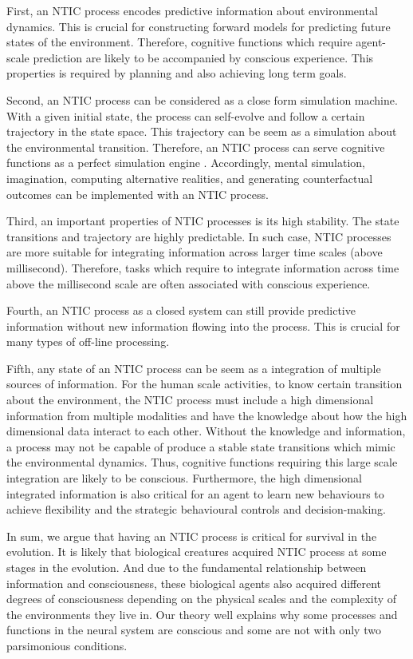 \documentclass[utf8]{article}
\begin{document}
		First, an NTIC process encodes predictive information about environmental dynamics. This is crucial for constructing forward models for predicting future states of the environment. Therefore, cognitive functions which require agent-scale prediction are likely to be accompanied by conscious experience. This properties is required by planning and also achieving long term goals.\needref{}
		
		Second, an NTIC process can be considered as a close form simulation machine. With a given initial state, the process can self-evolve and follow a certain trajectory in the state space. This trajectory can be seem as a simulation about the environmental transition. Therefore, an NTIC process can serve cognitive functions as a perfect simulation engine \citep{BERTSCHINGER.2006}. Accordingly, mental simulation, imagination, computing alternative realities, and generating counterfactual outcomes can be implemented with an NTIC process. \needref{}
		
	    Third, an important properties of NTIC processes is its high stability. The state transitions and trajectory are highly predictable. In such case, NTIC processes are more suitable for integrating information across larger time scales (above millisecond). Therefore, tasks which require to integrate information across time above the millisecond scale are often associated with conscious experience. 
	    
	    Fourth, an NTIC process as a closed system can still provide predictive information without new information flowing into the process. This is crucial for many types of off-line processing. 
	    
	    Fifth, any state of an NTIC process can be seem as a integration of multiple sources of information. For the human scale activities, to know certain transition about the environment, the NTIC process must include a high dimensional information from multiple modalities and have the knowledge about how the high dimensional data interact to each other. Without the knowledge and information, a process may not be capable of produce a stable state transitions which mimic the environmental dynamics. Thus, cognitive functions requiring this large scale integration are likely to be conscious. Furthermore, the high dimensional integrated information is also critical for an agent to learn new behaviours to achieve flexibility and the strategic behavioural controls and decision-making. 
	    
	    In sum, we argue that having an NTIC process is critical for survival in the evolution. It is likely that biological creatures acquired NTIC process at some stages in the evolution. And due to the fundamental relationship between information and consciousness, these biological agents also acquired different degrees of consciousness depending on the physical scales and the complexity of the environments they live in. Our theory well explains why some processes and functions in the neural system are conscious and some are not with only two parsimonious conditions. 
	    
\end{document}
